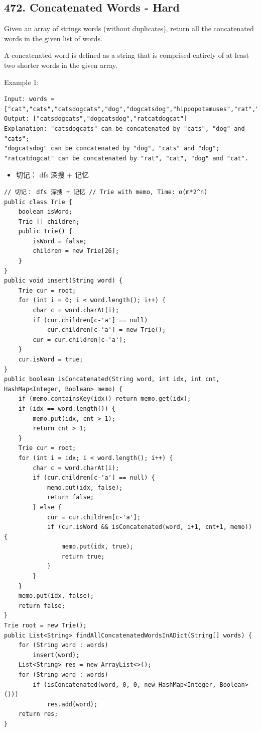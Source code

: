 \documentclass[9pt, b5paper]{article}
\begin{document}
\subsection{472. Concatenated Words - Hard}
\label{sec-13-6}
Given an array of strings words (without duplicates), return all the concatenated words in the given list of words.

A concatenated word is defined as a string that is comprised entirely of at least two shorter words in the given array.

Example 1:
\begin{verbatim}
Input: words = ["cat","cats","catsdogcats","dog","dogcatsdog","hippopotamuses","rat","ratcatdogcat"]
Output: ["catsdogcats","dogcatsdog","ratcatdogcat"]
Explanation: "catsdogcats" can be concatenated by "cats", "dog" and "cats"; 
"dogcatsdog" can be concatenated by "dog", "cats" and "dog"; 
"ratcatdogcat" can be concatenated by "rat", "cat", "dog" and "cat".
\end{verbatim}
\begin{itemize}
\item 切记： dfs 深搜 + 记忆
\end{itemize}
\begin{verbatim}
// 切记： dfs 深搜 + 记忆 // Trie with memo, Time: o(m*2^n)
public class Trie { 
    boolean isWord;
    Trie [] children;
    public Trie() {
        isWord = false;
        children = new Trie[26];
    }
}
public void insert(String word) { 
    Trie cur = root;
    for (int i = 0; i < word.length(); i++) {
        char c = word.charAt(i);
        if (cur.children[c-'a'] == null)
            cur.children[c-'a'] = new Trie();
        cur = cur.children[c-'a'];
    }
    cur.isWord = true;
}     
public boolean isConcatenated(String word, int idx, int cnt, HashMap<Integer, Boolean> memo) {
    if (memo.containsKey(idx)) return memo.get(idx);
    if (idx == word.length()) {
        memo.put(idx, cnt > 1);
        return cnt > 1;
    }
    Trie cur = root;
    for (int i = idx; i < word.length(); i++) {
        char c = word.charAt(i);
        if (cur.children[c-'a'] == null) {
            memo.put(idx, false);
            return false;
        } else {
            cur = cur.children[c-'a'];
            if (cur.isWord && isConcatenated(word, i+1, cnt+1, memo)) {
                memo.put(idx, true);
                return true;
            }
        }
    }
    memo.put(idx, false);
    return false;
}
Trie root = new Trie();
public List<String> findAllConcatenatedWordsInADict(String[] words) {
    for (String word : words) 
        insert(word);
    List<String> res = new ArrayList<>();
    for (String word : words) 
        if (isConcatenated(word, 0, 0, new HashMap<Integer, Boolean>()))
            res.add(word);
    return res;
}
\end{verbatim}
\end{document}
